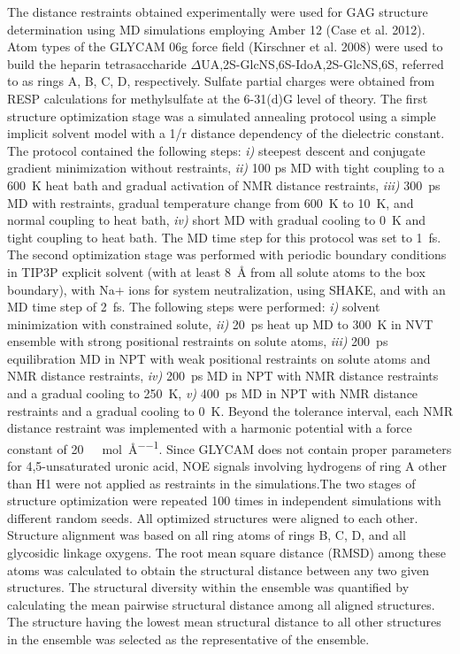 The distance restraints obtained experimentally were used for GAG structure
determination using MD simulations employing Amber 12 (Case et al. 2012). Atom
types of the GLYCAM 06g force field (Kirschner et al. 2008) were used to build
the heparin tetrasaccharide $\Delta$UA,2S-GlcNS,6S-IdoA,2S-GlcNS,6S, referred to
as rings A, B, C, D, respectively. Sulfate partial charges were obtained from
RESP calculations for methylsulfate at the 6-31(d)G level of theory. The first
structure optimization stage was a simulated annealing protocol using a simple
implicit solvent model with a 1/r distance dependency of the dielectric
constant. The protocol contained the following steps: \textit{i)} steepest
descent and conjugate gradient minimization without restraints, \textit{ii)} 100
ps MD with tight coupling to a \SI{600}{\kelvin} heat bath and gradual
activation of NMR distance restraints, \textit{iii)} \SI{300}{\pico\second} MD
with restraints, gradual temperature change from \SI{600}{\kelvin} to
\SI{10}{\kelvin}, and normal coupling to heat bath, \textit{iv)} short MD with
gradual cooling to \SI{0}{\kelvin} and tight coupling to heat bath. The MD time
step for this protocol was set to \SI{1}{\femto\second}. The second optimization
stage was performed with periodic boundary conditions in TIP3P explicit solvent
(with at least \SI{8}{\angstrom} from all solute atoms to the box boundary),
with Na+ ions for system neutralization, using SHAKE, and with an MD time step
of \SI{2}{\femto\second}. The following steps were performed: \textit{i)}
solvent minimization with constrained solute, \textit{ii)} \SI{20}{\pico\second}
heat up MD to \SI{300}{\kelvin} in NVT ensemble with strong positional
restraints on solute atoms, \textit{iii)} \SI{200}{\pico\second} equilibration
MD in NPT with weak positional restraints on solute atoms and NMR distance
restraints, \textit{iv)} \SI{200}{\pico\second} MD in NPT with NMR distance
restraints and a gradual cooling to \SI{250}{\kelvin}, \textit{v)}
\SI{400}{\pico\second} MD in NPT with NMR distance restraints and a gradual
cooling to \SI{0}{\kelvin}. Beyond the tolerance interval, each NMR distance
restraint was implemented with a harmonic potential with a force constant of
\SI{20}{\kilo\calory\per\mole\per\angstrom}. Since GLYCAM does not contain
proper parameters for 4,5-unsaturated uronic acid, NOE signals involving
hydrogens of ring A other than H1 were not applied as restraints in the
simulations.The two stages of structure optimization were repeated 100 times in
independent simulations with different random seeds. All optimized structures
were aligned to each other. Structure alignment was based on all ring atoms of
rings B, C, D, and all glycosidic linkage oxygens. The root mean square distance
(RMSD) among these atoms was calculated to obtain the structural distance
between any two given structures. The structural diversity within the ensemble
was quantified by calculating the mean pairwise structural distance among all
aligned structures. The structure having the lowest mean structural distance to
all other structures in the ensemble was selected as the representative of the
ensemble.

